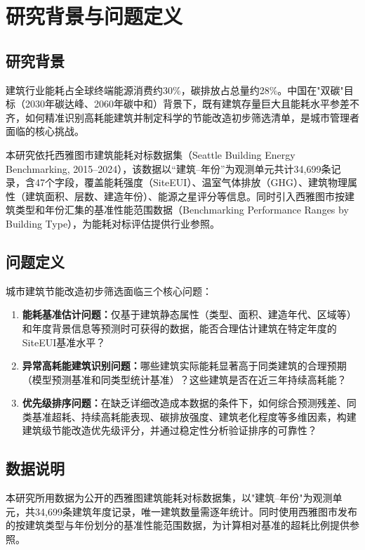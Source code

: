 \section{研究背景与问题定义}

\subsection{研究背景}

建筑行业能耗占全球终端能源消费约30\%，碳排放占总量约28\%\cite{unep2020global}。中国在"双碳"目标（2030年碳达峰、2060年碳中和）背景下，既有建筑存量巨大且能耗水平参差不齐，如何精准识别高耗能建筑并制定科学的节能改造初步筛选清单，是城市管理者面临的核心挑战。

本研究依托西雅图市建筑能耗对标数据集（Seattle Building Energy Benchmarking, 2015--2024），该数据以``建筑--年份''为观测单元共计34,699条记录，含47个字段，覆盖能耗强度（SiteEUI）、温室气体排放（GHG）、建筑物理属性（建筑面积、层数、建造年份）、能源之星评分等信息。同时引入西雅图市按建筑类型和年份汇集的基准性能范围数据（Benchmarking Performance Ranges by Building Type），为能耗对标评估提供行业参照。

\subsection{问题定义}

城市建筑节能改造初步筛选面临三个核心问题：
\begin{enumerate}
    \item \textbf{能耗基准估计问题：}仅基于建筑静态属性（类型、面积、建造年代、区域等）和年度背景信息等预测时可获得的数据，能否合理估计建筑在特定年度的SiteEUI基准水平？
    \item \textbf{异常高耗能建筑识别问题：}哪些建筑实际能耗显著高于同类建筑的合理预期（模型预测基准和同类型统计基准）？这些建筑是否在近三年持续高耗能？
    \item \textbf{优先级排序问题：}在缺乏详细改造成本数据的条件下，如何综合预测残差、同类基准超耗、持续高耗能表现、碳排放强度、建筑老化程度等多维因素，构建建筑级节能改造优先级评分，并通过稳定性分析验证排序的可靠性？
\end{enumerate}

\subsection{数据说明}

本研究所用数据为公开的西雅图建筑能耗对标数据集，以"建筑--年份"为观测单元，共34,699条建筑年度记录，唯一建筑数量需逐年统计。同时使用西雅图市发布的按建筑类型与年份划分的基准性能范围数据，为计算相对基准的超耗比例提供参照。

